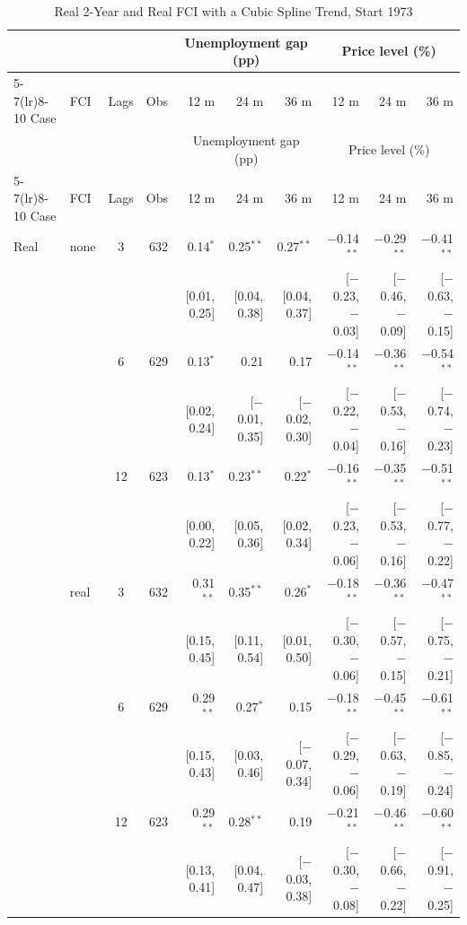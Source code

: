 \begingroup\scriptsize\setlength{\tabcolsep}{0.9pt}
\begin{longtable}{llcrrrrrrr}
\caption{Real 2-Year and Real FCI with a Cubic Spline Trend, Start 1973}\label{tab:appR2c73}\\
\toprule
 & & & & \multicolumn{3}{c}{Unemployment gap (pp)} & \multicolumn{3}{c}{Price level (\%)}\\ \cmidrule(lr){5-7}\cmidrule(lr){8-10}
Case & FCI & Lags & Obs & 12 m & 24 m & 36 m & 12 m & 24 m & 36 m\\
\midrule\endfirsthead
\toprule
 & & & & \multicolumn{3}{c}{Unemployment gap (pp)} & \multicolumn{3}{c}{Price level (\%)}\\ \cmidrule(lr){5-7}\cmidrule(lr){8-10}
Case & FCI & Lags & Obs & 12 m & 24 m & 36 m & 12 m & 24 m & 36 m\\
\midrule\endhead
\bottomrule\endfoot
Real & none & 3 & 632 & 0.14$^{*}$ & 0.25$^{**}$ & 0.27$^{**}$ & $-$0.14$^{**}$ & $-$0.29$^{**}$ & $-$0.41$^{**}$\\
 & & & & {\scriptsize [0.01, 0.25]} & {\scriptsize [0.04, 0.38]} & {\scriptsize [0.04, 0.37]} & {\scriptsize [$-$0.23, $-$0.03]} & {\scriptsize [$-$0.46, $-$0.09]} & {\scriptsize [$-$0.63, $-$0.15]}\\
 &  & 6 & 629 & 0.13$^{*}$ & 0.21 & 0.17 & $-$0.14$^{**}$ & $-$0.36$^{**}$ & $-$0.54$^{**}$\\
 & & & & {\scriptsize [0.02, 0.24]} & {\scriptsize [$-$0.01, 0.35]} & {\scriptsize [$-$0.02, 0.30]} & {\scriptsize [$-$0.22, $-$0.04]} & {\scriptsize [$-$0.53, $-$0.16]} & {\scriptsize [$-$0.74, $-$0.23]}\\
 &  & 12 & 623 & 0.13$^{*}$ & 0.23$^{**}$ & 0.22$^{*}$ & $-$0.16$^{**}$ & $-$0.35$^{**}$ & $-$0.51$^{**}$\\
 & & & & {\scriptsize [0.00, 0.22]} & {\scriptsize [0.05, 0.36]} & {\scriptsize [0.02, 0.34]} & {\scriptsize [$-$0.23, $-$0.06]} & {\scriptsize [$-$0.53, $-$0.16]} & {\scriptsize [$-$0.77, $-$0.22]}\\
 & real & 3 & 632 & 0.31$^{**}$ & 0.35$^{**}$ & 0.26$^{*}$ & $-$0.18$^{**}$ & $-$0.36$^{**}$ & $-$0.47$^{**}$\\
 & & & & {\scriptsize [0.15, 0.45]} & {\scriptsize [0.11, 0.54]} & {\scriptsize [0.01, 0.50]} & {\scriptsize [$-$0.30, $-$0.06]} & {\scriptsize [$-$0.57, $-$0.15]} & {\scriptsize [$-$0.75, $-$0.21]}\\
 &  & 6 & 629 & 0.29$^{**}$ & 0.27$^{*}$ & 0.15 & $-$0.18$^{**}$ & $-$0.45$^{**}$ & $-$0.61$^{**}$\\
 & & & & {\scriptsize [0.15, 0.43]} & {\scriptsize [0.03, 0.46]} & {\scriptsize [$-$0.07, 0.34]} & {\scriptsize [$-$0.29, $-$0.06]} & {\scriptsize [$-$0.63, $-$0.19]} & {\scriptsize [$-$0.85, $-$0.24]}\\
 &  & 12 & 623 & 0.29$^{**}$ & 0.28$^{**}$ & 0.19 & $-$0.21$^{**}$ & $-$0.46$^{**}$ & $-$0.60$^{**}$\\
 & & & & {\scriptsize [0.13, 0.41]} & {\scriptsize [0.04, 0.47]} & {\scriptsize [$-$0.03, 0.38]} & {\scriptsize [$-$0.30, $-$0.08]} & {\scriptsize [$-$0.66, $-$0.22]} & {\scriptsize [$-$0.91, $-$0.25]}\\
\end{longtable}
